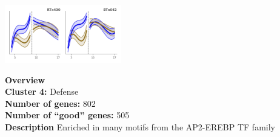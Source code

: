 \begin{multicols}{2}
\includegraphics[width=2in]{figures/clusters/root_Preflowering_3.png}
\columnbreak

\noindent \textbf{Overview}\\\textbf{Cluster 4:} Defense \\
\textbf{Number of genes:} 802 \\
\textbf{Number of ``good'' genes:} 505 \\
\textbf{Description} Enriched in many motifs from the AP2-EREBP TF family \\
\end{multicols}

